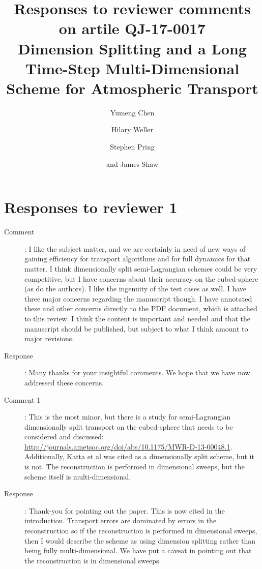 \documentclass[12pt]{article}
\begin{document}
\title{Responses to reviewer comments on artile QJ-17-0017\\
Dimension Splitting and a Long Time-Step Multi-Dimensional Scheme for Atmospheric Transport}
\author{Yumeng Chen \and Hilary Weller \and Stephen Pring \and and James Shaw}
\maketitle

\section*{Responses to reviewer 1}

\begin{description}

\item [Comment]:
I like the subject matter, and we are certainly in need of new ways of gaining efficiency for transport algorithms and for full dynamics for that matter. I think dimensionally split semi-Lagrangian schemes could be very competitive, but I have concerns about their accuracy on the cubed-sphere (as do the authors). I like the ingenuity of the test cases as well. I have three major concerns regarding the manuscript though. I have annotated these and other concerns directly to the PDF document, which is attached to this review. I think the content is important and needed and that the manuscript should be published, but subject to what I think amount to major revisions.

\item [Response]:
Many thanks for your insightful comments. We hope that we have now addressed these concerns. 

\item [Comment 1]: This is the most minor, but there is a study for semi-Lagrangian dimensionally split transport on the cubed-sphere that needs to be considered and discussed: \url{http://journals.ametsoc.org/doi/abs/10.1175/MWR-D-13-00048.1}. Additionally, Katta et al was cited as a dimensionally split scheme, but it is not. The reconstruction is performed in dimensional sweeps, but the scheme itself is multi-dimensional.

\item [Response]: 
Thank-you for pointing out the \cite{GNQ14} paper. This is now cited in the introduction. Transport errors are dominated by errors in the reconstruction so if the reconstruction is performed in dimensional sweeps, then I would describe the \cite{KNK15} scheme as using dimension splitting rather than being fully multi-dimensional. We have put a caveat in pointing out that the reconstruction is in dimensional sweeps. 


\end{description}
\end{document}
